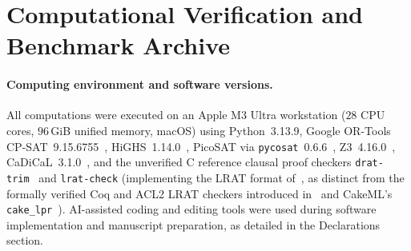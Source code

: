 \documentclass[11pt]{article}
\begin{document}
\section{Computational Verification and Benchmark Archive}\label{sec:verify}

\paragraph{Computing environment and software versions.}
All computations were executed on an Apple M3 Ultra workstation ($28$ CPU cores, $96\,$GiB unified memory, macOS) using Python~3.13.9, Google OR-Tools CP-SAT~9.15.6755~\cite{perron2023}, HiGHS~1.14.0~\cite{huangfu2018}, PicoSAT via \texttt{pycosat}~0.6.6~\cite{biere2008}, Z3~4.16.0~\cite{demoura2008}, CaDiCaL~3.1.0~\cite{biere2024}, and the unverified C reference clausal proof checkers \texttt{drat-trim}~\cite{wetzler2014} and \texttt{lrat-check} (implementing the LRAT format of~\cite{cruzfilipe2017}, as distinct from the formally verified Coq and ACL2 LRAT checkers introduced in~\cite{cruzfilipe2017} and CakeML's \texttt{cake\_lpr}~\cite{tan2021}). AI-assisted coding and editing tools were used during software implementation and manuscript preparation, as detailed in the Declarations section.
\end{document}
